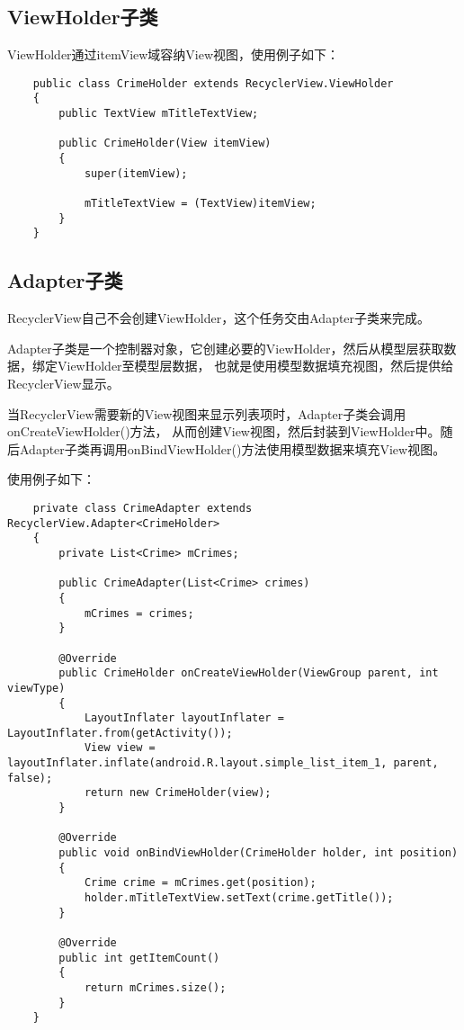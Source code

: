 \documentclass[a4paper,left=2.5cm,right=2.5cm,11pt]{article}
\begin{document}
\subsection{ViewHolder子类}
	ViewHolder通过itemView域容纳View视图，使用例子如下：
	\begin{lstlisting}
	public class CrimeHolder extends RecyclerView.ViewHolder
	{
		public TextView mTitleTextView;

		public CrimeHolder(View itemView)
		{
			super(itemView);

			mTitleTextView = (TextView)itemView;
		}
	}
	\end{lstlisting}

\subsection{Adapter子类}
	RecyclerView自己不会创建ViewHolder，这个任务交由Adapter子类来完成。\par

	Adapter子类是一个控制器对象，它创建必要的ViewHolder，然后从模型层获取数据，绑定ViewHolder至模型层数据，
	也就是使用模型数据填充视图，然后提供给RecyclerView显示。\par

	当RecyclerView需要新的View视图来显示列表项时，Adapter子类会调用onCreateViewHolder()方法，
	从而创建View视图，然后封装到ViewHolder中。随后Adapter子类再调用onBindViewHolder()方法使用模型数据来填充View视图。\par

	使用例子如下：
	\begin{lstlisting}
	private class CrimeAdapter extends RecyclerView.Adapter<CrimeHolder>
	{
		private List<Crime> mCrimes;

		public CrimeAdapter(List<Crime> crimes)
		{
			mCrimes = crimes;
		}

		@Override
		public CrimeHolder onCreateViewHolder(ViewGroup parent, int viewType)
		{
			LayoutInflater layoutInflater = LayoutInflater.from(getActivity());
			View view = layoutInflater.inflate(android.R.layout.simple_list_item_1, parent, false);
			return new CrimeHolder(view);
		}

		@Override
		public void onBindViewHolder(CrimeHolder holder, int position)
		{
			Crime crime = mCrimes.get(position);
			holder.mTitleTextView.setText(crime.getTitle());
		}

		@Override
		public int getItemCount()
		{
			return mCrimes.size();
		}
	}
	\end{lstlisting}
\end{document}

